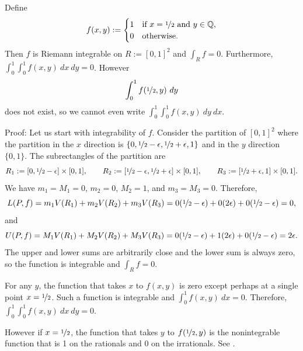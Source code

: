 \begin{example}
Define 
\begin{equation*}
f(x,y) := 
\begin{cases}
1 & \text{if } x=\nicefrac{1}{2} \text{ and } y \in {\mathbb{Q}}, \\
0 & \text{otherwise.}
\end{cases}
\end{equation*}
Then $f$ is Riemann integrable on $R := [0,1]^2$ and $\int_R f = 0$.
Furthermore, $\int_0^1 \int_0^1 f(x,y) ~ dx ~ dy = 0$.
However
\begin{equation*}
\int_0^1 f(\nicefrac{1}{2},y) ~ dy
\end{equation*}
does not exist, so we cannot even write $\int_0^1 \int_0^1 f(x,y) ~ dy ~ dx$.

Proof:
Let us start with integrability of $f$.  Consider the partition
of $[0,1]^2$ where the partition in the $x$ direction is
$\{ 0, \nicefrac{1}{2}-\epsilon,
\nicefrac{1}{2}+\epsilon,1\}$ and in the $y$ direction $\{ 0, 1 \}$.
The subrectangles of the partition are
\begin{equation*}
R_1 := [0,
\nicefrac{1}{2}-\epsilon] \times [0,1],
\qquad
R_2 := [\nicefrac{1}{2}-\epsilon,
\nicefrac{1}{2}+\epsilon] \times [0,1],
\qquad
R_3 := [\nicefrac{1}{2}+\epsilon,1] \times [0,1] .
\end{equation*}
We have $m_1 = M_1 = 0$, $m_2 =0$, $M_2 = 1$, and $m_3 = M_3 = 0$.
Therefore,
\begin{equation*}
L(P,f) = 
m_1 V(R_1)
+
m_2 V(R_2)
+
m_3 V(R_3)
=
0 (\nicefrac{1}{2}-\epsilon)
+
0 (2\epsilon)
+
0 (\nicefrac{1}{2}-\epsilon) = 0 ,
\end{equation*}
and
\begin{equation*}
U(P,f) = 
M_1 V(R_1)
+
M_2 V(R_2)
+
M_3 V(R_3)
=
0 (\nicefrac{1}{2}-\epsilon)
+
1 (2\epsilon)
+
0 (\nicefrac{1}{2}-\epsilon) = 2 \epsilon .
\end{equation*}
The upper and lower sums are arbitrarily close and the lower sum is always
zero, so the function is integrable and $\int_R f = 0$.

For any $y$, the function that takes $x$ to $f(x,y)$ is zero except
perhaps at a single point $x=\nicefrac{1}{2}$.  Such a
function is integrable and $\int_0^1 f(x,y) ~ dx = 0$.  Therefore,
$\int_0^1 \int_0^1 f(x,y) ~ dx ~ dy = 0$.

However if $x=\nicefrac{1}{2}$, the function that takes $y$ to
$f(\nicefrac{1}{2},y)$ is the nonintegrable function that is
1 on the rationals and 0 on the irrationals.
See .
\end{example}

